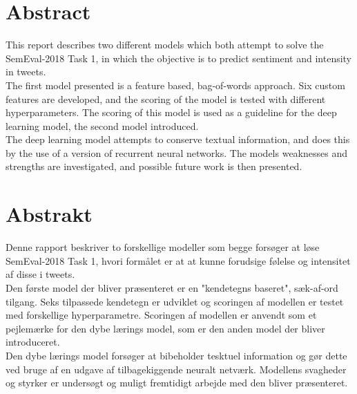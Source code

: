 
\section*{Abstract}
This report describes two different models which both attempt to solve the SemEval-2018 Task 1, in which the objective is to predict sentiment and intensity in tweets.\\
The first model presented is a feature based, bag-of-words approach. Six custom features are developed, and the scoring of the model is tested with different hyperparameters. The scoring of this model is used as a guideline for the deep learning model, the second model introduced.\\
The deep learning model attempts to conserve textual information, and does this by the use of a version of recurrent neural networks. The models weaknesses and strengths are investigated, and possible future work is then presented. 

\section*{Abstrakt}
Denne rapport beskriver to forskellige modeller som begge forsøger at løse SemEval-2018 Task 1, hvori formålet er at at kunne forudsige følelse og intensitet af disse i tweets.\\
Den første model der bliver præsenteret er en "kendetegns baseret", sæk-af-ord tilgang. Seks tilpassede kendetegn er udviklet og scoringen af modellen er testet med forskellige hyperparametre. Scoringen af modellen er anvendt som et pejlemærke for den dybe lærings model, som er den anden model der bliver introduceret.\\
Den dybe lærings model forsøger at bibeholder tesktuel information og gør dette ved bruge af en udgave af tilbagekiggende neuralt netværk. Modellens svagheder og styrker er undersøgt og muligt fremtidigt arbejde med den bliver præsenteret. 
